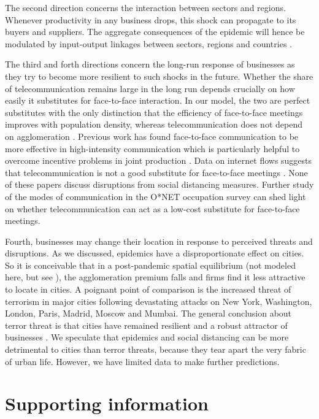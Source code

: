 The second direction concerns the interaction between sectors and regions. Whenever productivity in any business drops, this shock can propagate to its buyers and suppliers. The aggregate consequences of the epidemic will hence be modulated by input-output linkages between sectors, regions and countries \cite{Caliendo2014-mr,Caselli2020-nf,Baldwin2020-wb}.

The third and forth directions concern the long-run response of businesses as they try to become more resilient to such shocks in the future. Whether the share of telecommunication remains large in the long run depends crucially on how easily it substitutes for face-to-face interaction. In our model, the two are perfect substitutes with the only distinction that the efficiency of face-to-face meetings improves with population density, whereas telecommunication does not depend on agglomeration \cite{Rossi-Hansberg2007-tm,Ioannides2008-bs,Tian2019-wq}. Previous work has found face-to-face communication to be more effective in high-intensity communication which is particularly helpful to overcome incentive problems in joint production \cite{Gaspar1998-gy,Storper2004-mg}. Data on internet flows suggests that telecommunication is not a good substitute for face-to-face meetings \cite{Cuberes2013-js}. None of these papers discuss disruptions from social distancing measures. Further study of the modes of communication in the O*NET occupation survey can shed light on whether telecommunication can act as a low-cost substitute for face-to-face meetings.

Fourth, businesses may change their location in response to perceived threats and disruptions. As we discussed, epidemics have a disproportionate effect on cities. So it is conceivable that in a post-pandemic spatial equilibrium (not modeled here, but see \cite{Tian2019-wq}), the agglomeration premium falls and firms find it less attractive to locate in cities. A poignant point of comparison is the increased threat of terrorism in major cities following devastating attacks on New York, Washington, London, Paris, Madrid, Moscow and Mumbai. The general conclusion about terror threat is that cities have remained resilient and a robust attractor of businesses \cite{Glaeser2002-mw,Harrigan2002-ik}. We speculate that epidemics and social distancing can be more detrimental to cities than terror threats, because they tear apart the very fabric of urban life. However, we have limited data to make further predictions.

\section*{Supporting information}

